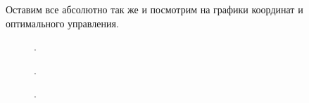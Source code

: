 Оставим все абсолютно так же и посмотрим на графики координат и оптимального управления.
\begin{figure}[bh]
        \noindent{}
        \caption{.}
        \label{img:discr_control}
\end{figure}
\begin{figure}[bh]
        \noindent{}
        \caption{.}
        \label{img:control}
\end{figure}
\begin{figure}[bh]
        \noindent{}
        \caption{.}
        \label{img:coords}
\end{figure}
